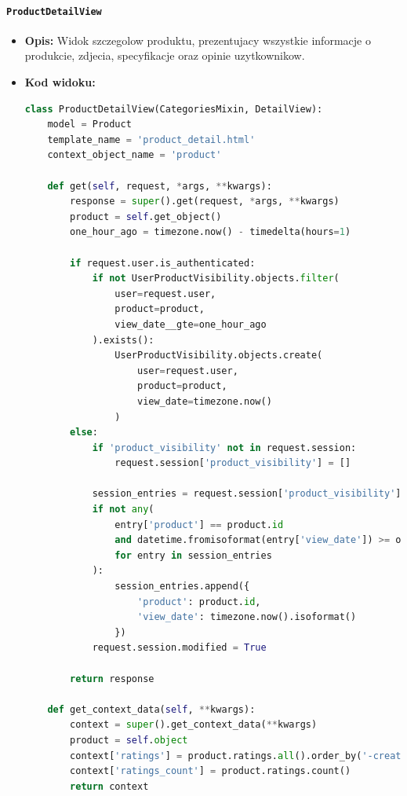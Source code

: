 \documentclass[12pt,a4paper,oneside]{article}
\theoremstyle{definition}
\numberwithin{equation}{section}
\begin{document}
\paragraph{\texttt{ProductDetailView}}
    \begin{itemize}
        \item \textbf{Opis:} Widok szczegolow produktu, prezentujacy wszystkie informacje o produkcie, zdjecia, specyfikacje oraz opinie uzytkownikow.
        \item \textbf{Kod widoku:}
        \begin{lstlisting}[language=Python, caption=ProductDetailView]
class ProductDetailView(CategoriesMixin, DetailView):
    model = Product
    template_name = 'product_detail.html'
    context_object_name = 'product'

    def get(self, request, *args, **kwargs):
        response = super().get(request, *args, **kwargs)
        product = self.get_object()
        one_hour_ago = timezone.now() - timedelta(hours=1)

        if request.user.is_authenticated:
            if not UserProductVisibility.objects.filter(
                user=request.user,
                product=product,
                view_date__gte=one_hour_ago
            ).exists():
                UserProductVisibility.objects.create(
                    user=request.user, 
                    product=product, 
                    view_date=timezone.now()
                )
        else:
            if 'product_visibility' not in request.session:
                request.session['product_visibility'] = []

            session_entries = request.session['product_visibility']
            if not any(
                entry['product'] == product.id 
                and datetime.fromisoformat(entry['view_date']) >= one_hour_ago
                for entry in session_entries
            ):
                session_entries.append({
                    'product': product.id,
                    'view_date': timezone.now().isoformat()
                })
            request.session.modified = True

        return response

    def get_context_data(self, **kwargs):
        context = super().get_context_data(**kwargs)
        product = self.object
        context['ratings'] = product.ratings.all().order_by('-created_at')
        context['ratings_count'] = product.ratings.count()
        return context
        \end{lstlisting}


\end{itemize}
\end{document}
